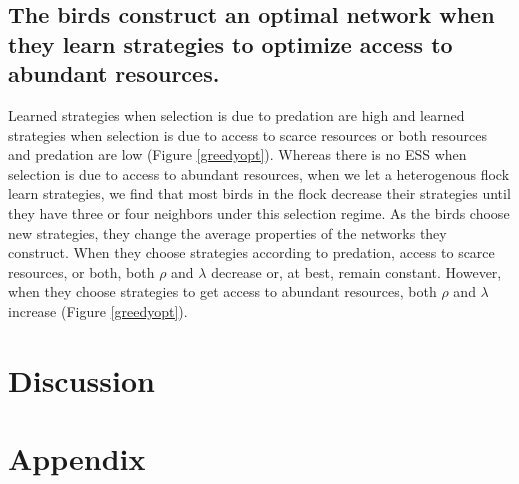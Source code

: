 \documentclass{article}
\begin{document}
\subsection{The birds construct an optimal network when they learn strategies to optimize access to abundant resources. }
Learned strategies when selection is due to predation are high and learned strategies when selection is due to access to scarce resources or both resources and predation are low (Figure \ref{greedyopt}). Whereas there is no ESS when selection is due to access to abundant resources, when we let a heterogenous flock learn strategies, we find that most birds in the flock decrease their strategies until they have three or four neighbors under this selection regime.  As the birds choose new strategies, they change the average properties of the networks they construct. When they choose strategies according to predation, access to scarce resources, or both, both $\rho$ and $\lambda$ decrease or, at best, remain constant. However, when they choose strategies to get access to abundant resources, both $\rho$ and $\lambda$ increase (Figure \ref{greedyopt}). 



\section{Discussion}
%
%



\newpage
\section{Appendix}
\end{document}
